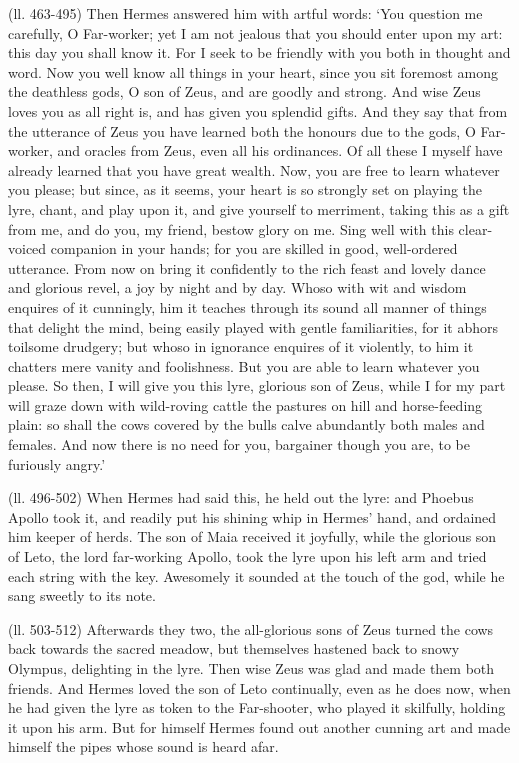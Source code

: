(ll. 463-495) Then Hermes answered him with artful words: ‘You question
me carefully, O Far-worker; yet I am not jealous that you should enter upon my
art: this day you shall know it. For I seek to be friendly with you both in
thought and word. Now you well know all things in your heart, since you sit
foremost among the deathless gods, O son of Zeus, and are goodly and strong.
And wise Zeus loves you as all right is, and has given you splendid gifts. And
they say that from the utterance of Zeus you have learned both the honours due
to the gods, O Far-worker, and oracles from Zeus, even all his ordinances. Of
all these I myself have already learned that you have great wealth. Now, you
are free to learn whatever you please; but since, as it seems, your heart is so
strongly set on playing the lyre, chant, and play upon it, and give yourself to
merriment, taking this as a gift from me, and do you, my friend, bestow glory
on me. Sing well with this clear-voiced companion in your hands; for you are
skilled in good, well-ordered utterance. From now on bring it confidently to
the rich feast and lovely dance and glorious revel, a joy by night and by day.
Whoso with wit and wisdom enquires of it cunningly, him it teaches through its
sound all manner of things that delight the mind, being easily played with
gentle familiarities, for it abhors toilsome drudgery; but whoso in ignorance
enquires of it violently, to him it chatters mere vanity and foolishness. But
you are able to learn whatever you please. So then, I will give you this lyre,
glorious son of Zeus, while I for my part will graze down with wild-roving
cattle the pastures on hill and horse-feeding plain: so shall the cows covered
by the bulls calve abundantly both males and females. And now there is no need
for you, bargainer though you are, to be furiously angry.’

(ll. 496-502) When Hermes had said this, he held out the lyre: and Phoebus
Apollo took it, and readily put his shining whip in Hermes’ hand, and
ordained him keeper of herds. The son of Maia received it joyfully, while the
glorious son of Leto, the lord far-working Apollo, took the lyre upon his left
arm and tried each string with the key. Awesomely it sounded at the touch of
the god, while he sang sweetly to its note.

(ll. 503-512) Afterwards they two, the all-glorious sons of Zeus turned the
cows back towards the sacred meadow, but themselves hastened back to snowy
Olympus, delighting in the lyre. Then wise Zeus was glad and made them both
friends. And Hermes loved the son of Leto continually, even as he does now,
when he had given the lyre as token to the Far-shooter, who played it
skilfully, holding it upon his arm. But for himself Hermes found out another
cunning art and made himself the pipes whose sound is heard afar.

